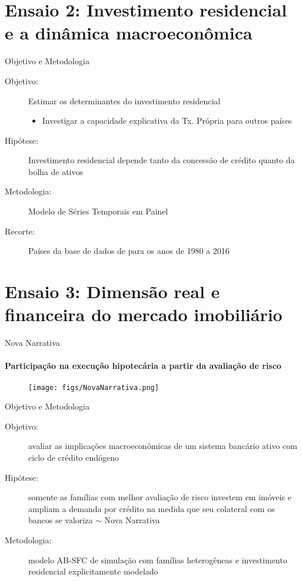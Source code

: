 \documentclass[11pt]{beamer}
\begin{document}
\section[Painel]{\textbf{Ensaio 2:} Investimento residencial e a dinâmica macroeconômica}

\begin{frame}{Objetivo e Metodologia}

\begin{description}
    \item[Objetivo:]  Estimar os determinantes do investimento residencial

        \begin{itemize}
            \item Investigar a capacidade explicativa da Tx. Própria para outros países
        \end{itemize}

    \item[Hipótese:] Investimento residencial depende tanto da concessão de crédito quanto da bolha de ativos
    \item[Metodologia:] Modelo de Séries Temporais em Painel
    \item[Recorte:] Países da base de dados de \textcite{jorda_rate_2019} para os anos de 1980 a 2016
\end{description}
\end{frame}

\section[AB-SFC]{\textbf{Ensaio 3:} Dimensão real e financeira do mercado imobiliário}

\begin{frame}{Nova Narrativa}
\framesubtitle{Participação na execução hipotecária a partir da avaliação de risco}


\begin{figure}
    \centering
    \texttt{[image: figs/NovaNarrativa.png]}
\end{figure}

\end{frame}



\begin{frame}{Objetivo e Metodologia}

\begin{description}
    \item[Objetivo:]  avaliar as implicações macroeconômicas de um sistema bancário ativo com ciclo de crédito endógeno
\item[Hipótese:] somente as famílias com melhor avaliação de risco investem em imóveis e ampliam a demanda por crédito na medida que seu colateral com os bancos se valoriza $\sim$ Nova Narrativa
    \item[Metodologia:] modelo AB-SFC de simulação com famílias heterogêneas e investimento residencial explicitamente modelado
\end{description}
\end{frame}
\end{document}
